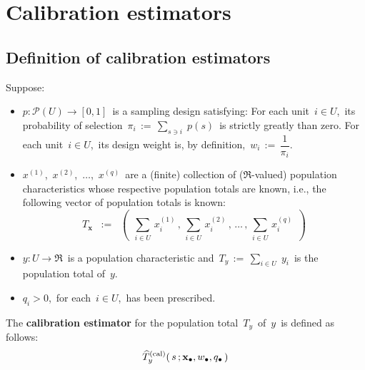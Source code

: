 

\section{Calibration estimators}


\subsection{Definition of calibration estimators}


\begin{definition}
\mbox{}
\vskip 0.05cm
\noindent
Suppose:
\begin{itemize}
\item
    $p : \mathcal{P}(U) \longrightarrow [0,1]$\,
    is a sampling design satisfying:
    For each unit \,$i \in U$,\,
    its probability of selection
    \,$\pi_{i} \,:=\, \underset{s \ni i}{\sum}\;p(s)$\,
    is strictly greatly than zero.
    For each unit \,$i \in U$,\,
    its design weight is, by definition,
    \,$w_{i} \,:=\, \dfrac{1}{\pi_{i}}$.\,
\item
    $x^{(1)}$,\, $x^{(2)}$,\, $\ldots$\;,\, $x^{(q)}$\,
    are a (finite) collection of ($\Re$-valued) population characteristics
    whose respective population totals are known,
    i.e., the following vector of population totals is known:
    \begin{equation*}
    T_{\mathbf{x}}
    \;\; := \;\;
        \left(\;\,
            \underset{i \in U}{\sum}\,x_{i}^{(1)}
            \,,\,
            \underset{i \in U}{\sum}\,x_{i}^{(2)}
            \,,\,
            \ldots
            \,,\,
            \underset{i \in U}{\sum}\,x_{i}^{(q)}
            \;\,\right)
    \end{equation*}
\item
    $y : U \longrightarrow \Re$\,
    is a population characteristic and
    \,$T_{y} \,:=\, \underset{i \in U}{\sum}\;y_{i}$\,
    is the population total of \,$y$.
\item
    $q_{i} > 0$,\, for each \,$i \in U$,\, has been prescribed.
\end{itemize}
The \textbf{calibration estimator} for the population total \,$T_{y}$\, of \,$y$\,
is defined as follows:
\begin{eqnarray*}
\widehat{T}_{y}^{\textnormal{(cal)}}(\,s\,;\mathbf{x}_{\bullet},w_{\bullet},q_{\bullet}\,)

\end{eqnarray*}
\end{definition}
